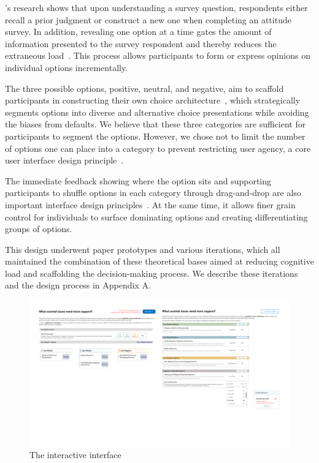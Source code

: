 \textcite{strackThinkingJudgingCommunicating1987}'s research shows that upon understanding a survey question, respondents either recall a prior judgment or construct a new one when completing an attitude survey. In addition, revealing one option at a time gates the amount of information presented to the survey respondent and thereby reduces the extraneous load~\cite{swellerCognitiveLoadTheory2011}. This process allows participants to form or express opinions on individual options incrementally.

The three possible options, positive, neutral, and negative, aim to scaffold participants in constructing their own choice architecture~\cite{munscherReviewTaxonomyChoice2016, thalerNudgeImprovingDecisions2008a}, which strategically segments options into diverse and alternative choice presentations while avoiding the biases from defaults. We believe that these three categories are sufficient for participants to segment the options. However, we chose not to limit the number of options one can place into a category to prevent restricting user agency, a core user interface design principle~\cite{norman2013design}.

The immediate feedback showing where the option sits and supporting participants to shuffle options in each category through drag-and-drop are also important interface design principles~\cite{norman2013design}. At the same time, it allows finer grain control for individuals to surface dominating options and creating differentiating groups of options.

This design underwent paper prototypes and various iterations, which all maintained the combination of these theoretical bases aimed at reducing cognitive load and scaffolding the decision-making process. We describe these iterations and the design process in Appendix A.
\begin{figure}[h]
    \centering
    \includegraphics[width=1\textwidth]{content/image/interface.png}
    \caption{The interactive interface}
    \label{fig:interactiveInterface}
\end{figure}

